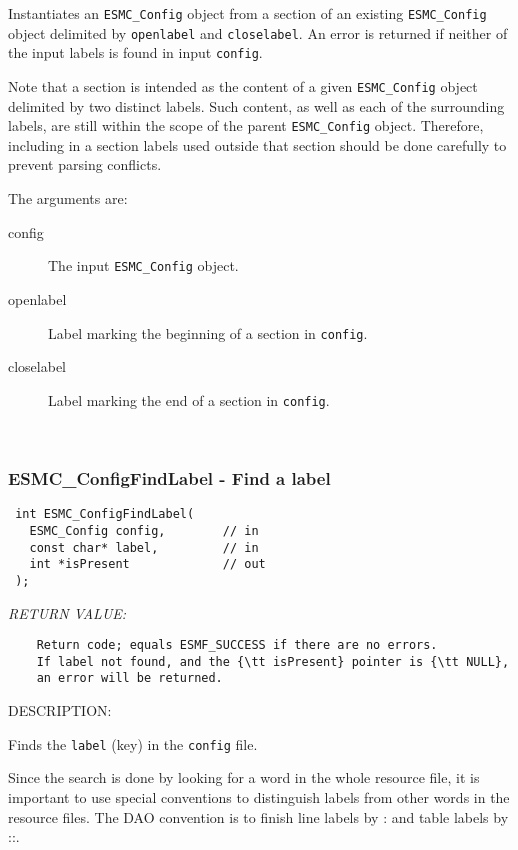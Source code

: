      Instantiates an {\tt ESMC\_Config} object from a section of an existing
     {\tt ESMC\_Config} object delimited by {\tt openlabel} and {\tt closelabel}.
     An error is returned if neither of the input labels is found in input
     {\tt config}.
  
     Note that a section is intended as the content of a given {\tt ESMC\_Config}
     object delimited by two distinct labels. Such content, as well as each of the
     surrounding labels, are still within the scope of the parent {\tt ESMC\_Config}
     object. Therefore, including in a section labels used outside that
     section should be done carefully to prevent parsing conflicts.
  
     The arguments are:
     \begin{description}
       \item[config]
         The input {\tt ESMC\_Config} object.
       \item[openlabel]
         Label marking the beginning of a section in {\tt config}.
       \item[closelabel]
         Label marking the end of a section in {\tt config}.
     \end{description}
   
 
\mbox{}\hrulefill\ 
 
\subsubsection [ESMC\_ConfigFindLabel] {ESMC\_ConfigFindLabel - Find a label}


  
\begin{verbatim} int ESMC_ConfigFindLabel(
   ESMC_Config config,        // in
   const char* label,         // in
   int *isPresent             // out
 );\end{verbatim}{\em RETURN VALUE:}
\begin{verbatim}    Return code; equals ESMF_SUCCESS if there are no errors.
    If label not found, and the {\tt isPresent} pointer is {\tt NULL},
    an error will be returned.\end{verbatim}
{\sf DESCRIPTION:\\ }


    Finds the {\tt label} (key) in the {\tt config} file. 
  
    Since the search is done by looking for a word in the 
    whole resource file, it is important to use special 
    conventions to distinguish labels from other words 
    in the resource files. The DAO convention is to finish 
    line labels by : and table labels by ::.
  
